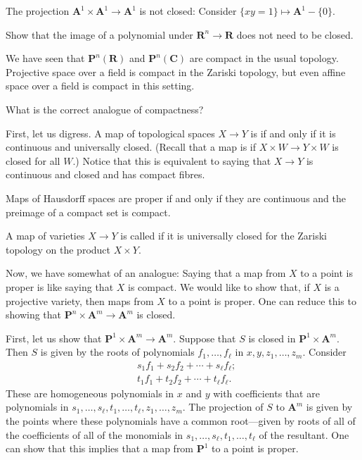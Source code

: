 \documentclass [11 pt, oneside] {article}
\begin{document}
\begin{example}[ ]\label{}\text{}
The projection $\mathbf{A}^1\times \mathbf{A}^1 \longrightarrow \mathbf{A}^1$ is not closed: Consider $\{xy=1\}\longmapsto \mathbf{A}^1-\{0\}$.
\end{example}

\begin{exercise}\label{}\text{}
Show that the image of a polynomial under $\mathbf{R}^n\longrightarrow \mathbf{R}$ does not need to be closed.
\end{exercise}

We have seen that $\mathbf{P}^n(\mathbf{R})$ and $\mathbf{P}^n(\mathbf{C})$ are compact in the usual topology. Projective space over a field is compact in the Zariski topology, but even affine space over a field is compact in this setting.

\begin{problem}
	What is the correct analogue of compactness?
\end{problem}

First, let us digress. A map of topological spaces $X\longrightarrow Y$ is  if and only if it is continuous and universally closed. (Recall that a map is  if $X\times W\longrightarrow Y\times W$ is closed for all $W$.) Notice that this is equivalent to saying that $X\longrightarrow Y$ is continuous and closed and has compact fibres.

Maps of Hausdorff spaces are proper if and only if they are continuous and the preimage of a compact set is compact.

A map of varieties $X\longrightarrow Y$ is called  if it is universally closed for the Zariski topology on the product $X\times Y$. 

Now, we have somewhat of an analogue: Saying that a map from $X$ to a point is proper is like saying that $X$ is compact. We would like to show that, if $X$ is a projective variety, then maps from $X$ to a point is proper. One can reduce this to showing that $\mathbf{P}^n\times \mathbf{A}^m\longrightarrow \mathbf{A}^m$ is closed.

First, let us show that $\mathbf{P}^1\times \mathbf{A}^m\longrightarrow \mathbf{A}^m$. Suppose that $S$ is closed in $\mathbf{P}^1\times \mathbf{A}^m$. Then $S$ is given by the roots of polynomials $f_1,\hdots, f_\ell$ in $x,y, z_1,\hdots,z_m$. Consider 
\begin{align*}
	&s_1f_1+s_2f_2+\cdots+s_\ell f_\ell;\\
	&t_1f_1+t_2f_2+\cdots+t_\ell f_\ell.
\end{align*}
These are homogeneous polynomials in $x$ and $y$ with coefficients that are polynomials in $s_1,\hdots,s_\ell,t_1,\hdots, t_\ell,z_1,\hdots, z_m$. The projection of $S$ to $\mathbf{A}^m$ is given by the points where these polynomials have a common root---given by roots of all of the coefficients of all of the monomials in $s_1,\hdots,s_\ell,t_1,\hdots, t_\ell$ of the resultant. One can show that this implies that a map from $\mathbf{P}^1$ to a point is proper.
\end{document}
